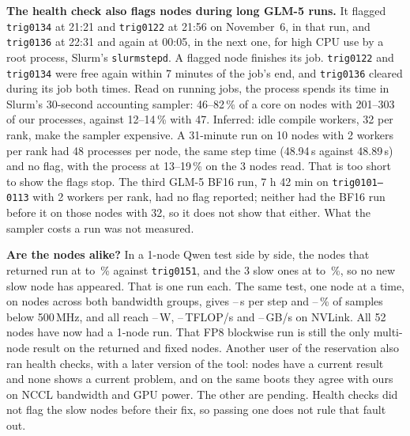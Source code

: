 \textbf{The health check also flags nodes during long GLM-5 runs.} It flagged \texttt{trig0134} at 21:21 and \texttt{trig0122} at 21:56 on November~6, in that run, and \texttt{trig0136} at 22:31 and again at 00:05, in the next one, for high CPU use by a root process, Slurm's \texttt{slurmstepd}. A flagged node finishes its job. \texttt{trig0122} and \texttt{trig0134} were free again within 7 minutes of the job's end, and \texttt{trig0136} cleared during its job both times. Read on running jobs, the process spends its time in Slurm's 30-second accounting sampler: 46--82\,\% of a core on nodes with 201--303 of our processes, against 12--14\,\% with 47. Inferred: idle compile workers, 32 per rank, make the sampler expensive. A 31-minute run on 10 nodes with 2 workers per rank had 48 processes per node, the same step time (48.94\,s against 48.89\,s) and no flag, with the process at 13--19\,\% on the 3 nodes read. That is too short to show the flags stop. The third GLM-5 BF16 run, 7 h 42 min on \texttt{trig0101--0113} with 2 workers per rank, had no flag reported; neither had the BF16 run before it on those nodes with 32, so it does not show that either. What the sampler costs a run was not measured.

\textbf{Are the nodes alike?} In a 1-node Qwen test side by side, the \TriBackNodes{} nodes that returned run at \TriBackPctLo{} to \TriBackPctHi\,\% against \texttt{trig0151}, and the 3 slow ones at \TriBackSlowLo{} to \TriBackSlowHi\,\%, so no new slow node has appeared. That is one run each. The same test, one node at a time, on \TriAllNodes{} nodes across both bandwidth groups, gives \TriAllStepLo--\TriAllStepHi\,s per step and \TriAllLowLo--\TriAllLowHi\,\% of samples below 500\,MHz, and all reach \TriAllWattLo--\TriAllWattHi\,W, \TriAllTflopLo--\TriAllTflopHi\,TFLOP/s and \TriAllNvlsLo--\TriAllNvlsHi\,GB/s on NVLink. All 52 nodes have now had a 1-node run. That FP8 blockwise run is still the only multi-node result on the returned and fixed nodes. Another user of the reservation also ran health checks, with a later version of the tool: \TriOtherHealthNodes{} nodes have a current result and none shows a current problem, and on the same boots they agree with ours on NCCL bandwidth and GPU power. The other \TriOtherHealthPending{} are pending. Health checks did not flag the slow nodes before their fix, so passing one does not rule that fault out.

